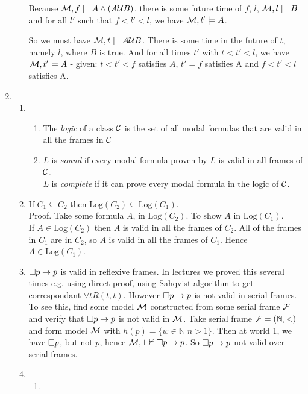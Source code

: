 \documentclass[a4paper, draft, 12pt]{article}
\begin{document}
\begin{enumerate}
\begin{enumerate}
  Because $\mathcal{M}, f \models A \wedge (A \mathcal{U} B)$, there is some future time of $f$, $l$,
  $\mathcal{M}, l \models B$ and for all $l'$ such that $f< l' < l$, we have $\mathcal{M}, l' \models A$.

  So we must have $\mathcal{M}, t \models A \mathcal{U} B$. There is some time in the future of $t$, 
  namely $l$, where $B$ is true. And for all times $t'$ with $t < t' < l$, 
  we have $\mathcal{M}, t' \models A$ - given: $t < t' < f$ satisfies $A$, $t' = f$ satisfies A and $f < t' < l$ satisfies A.
\end{enumerate}
\item %
\begin{enumerate}
\item %
  \begin{enumerate}
  \item %
  The \textit{logic} of a class $\mathcal{C}$ is the set of all modal formulas that are valid in all the frames in $\mathcal{C}$
  \item %
  $L$ is \textit{sound} if every modal formula proven by $L$ is valid in all frames of $\mathcal{C}$. \\
  $L$ is \textit{complete} if it can prove every modal formula in the logic of $\mathcal{C}$. \\
  \end{enumerate}
  \item %
  If $C_1 \subseteq C_2$ then $\text{Log}(C_2) \subseteq \text{Log}(C_1)$. \\
  Proof. Take some formula $A$, in $\text{Log}(C_2)$. To show $A$ in $\text{Log}(C_1)$. \\
  If $A \in \text{Log}(C_2)$ then $A$ is valid in all the frames of $C_2$. 
  All of the frames in $C_1$ are in $C_2$, so $A$ is valid in all the frames of $C_1$. 
  Hence $A \in \text{Log}(C_1)$. 
  \item %
  $\square p \rightarrow p$ is valid in reflexive frames. In lectures we proved this several times 
  e.g. using direct proof, using Sahqvist algorithm to get correspondant $\forall t R(t,t)$. 
  However $\square p \rightarrow p$ is not valid in serial frames. To see this,
  find some model $\mathcal{M}$ constructed from some serial frame $\mathcal{F}$ and verify that $\square p \rightarrow p$ is not valid in $\mathcal{M}$. 
  Take serial frame $\mathcal{F} = (\mathbb{N}, <)$ and form model $\mathcal{M}$ with $h(p) = \{w \in \mathbb{N} | n > 1 \}$. 
  Then at world 1, we have $\square p$, but not $p$, 
  hence $\mathcal{M}, 1 \nvDash \square p \rightarrow p$. So $\square p \rightarrow p$ not valid over serial frames.
  \item %
  \begin{enumerate}
  \item %

\end{enumerate}
\end{enumerate}
\end{enumerate}
\end{document}
